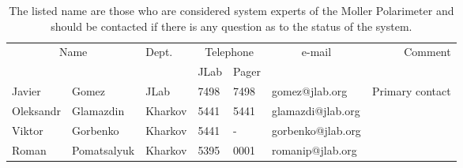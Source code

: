 \begin{safetyen}{0}{0}
\begin{table}[h]
\begin{center}
\begin{tabular}{|ll|l|l|l|l|r|} \hline
  \multicolumn{2}{|c|}{Name} & Dept. & \multicolumn{2}{c|}{Telephone} & 
  \multicolumn{1}{c|}{e-mail} & Comment \\ 
  \cline{4-5}
   &  &   & JLab & Pager &  & \\ 
\hline
 Javier       & Gomez           & JLab    & 7498 & 7498 & gomez@jlab.org    & Primary contact     \\ 
 Oleksandr    & Glamazdin       & Kharkov & 5441 & 5441 & glamazdi@jlab.org &  \\ 
 Viktor       & Gorbenko        & Kharkov & 5441 &   -  & gorbenko@jlab.org &  \\ 
 Roman        & Pomatsalyuk     & Kharkov & 5395 & 0001 & romanip@jlab.org  &  \\ 
\hline
\end{tabular}
\end{center}
\caption[Moller Polarimeter: authorized personnel]{
   The listed name are those who are considered system experts of the Moller Polarimeter and should be contacted
   if there is any question as to the status of the system.
}
\label{tab:moller:personnel}
\end{table}
\end{safetyen}

